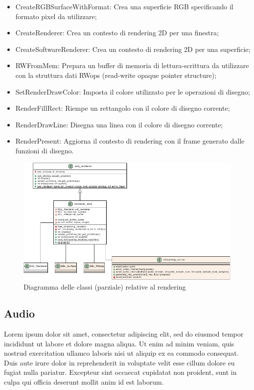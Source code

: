 \begin{itemize}
	\item CreateRGBSurfaceWithFormat: Crea una superficie RGB specificando il formato pixel da utilizzare;
	\item CreateRenderer: Crea un contesto di rendering 2D per una finestra;
	\item CreateSoftwareRenderer: Crea un contesto di rendering 2D per una superficie;
	\item RWFromMem: Prepara un buffer di memoria di lettura-scrittura da utilizzare con la struttura dati RWops (read-write opaque pointer structure);
	\item SetRenderDrawColor: Imposta il colore utilizzato per le operazioni di disegno;
	\item RenderFillRect: Riempe un rettangolo con il colore di disegno corrente;
	\item RenderDrawLine: Disegna una linea con il colore di disegno corrente;
	\item RenderPresent: Aggiorna il contesto di rendering con il frame generato dalle funzioni di disegno.
\end{itemize}

\begin{figure}[H]
	\includegraphics[width=\linewidth]{immagini/render_class_original_vs_streaming}
	\caption{Diagramma delle classi (parziale) relative al rendering}
	\label{fig:render_class_original_vs_streaming}
\end{figure}


\subsection{Audio} \label{Cattura_Audio}
Lorem ipsum dolor sit amet, consectetur adipiscing elit, sed do eiusmod tempor incididunt ut labore et dolore magna aliqua. Ut enim ad minim veniam, quis nostrud exercitation ullamco laboris nisi ut aliquip ex ea commodo consequat. Duis aute irure dolor in reprehenderit in voluptate velit esse cillum dolore eu fugiat nulla pariatur. Excepteur sint occaecat cupidatat non proident, sunt in culpa qui officia deserunt mollit anim id est laborum.




